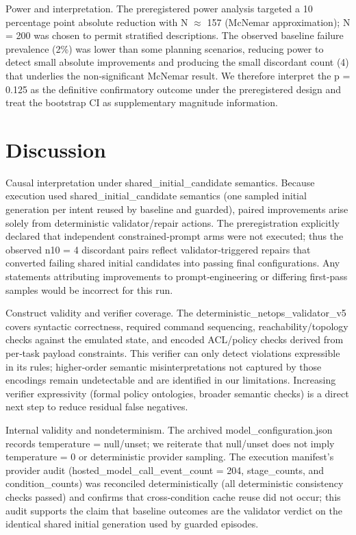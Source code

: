 \documentclass[conference]{IEEEtran}
\begin{document}
Power and interpretation. The preregistered power analysis targeted a 10 percentage point absolute reduction with N \ensuremath{\approx} 157 (McNemar approximation); N = 200 was chosen to permit stratified descriptions. The observed baseline failure prevalence (2\%) was lower than some planning scenarios, reducing power to detect small absolute improvements and producing the small discordant count (4) that underlies the non‑significant McNemar result. We therefore interpret the p = 0.125 as the definitive confirmatory outcome under the preregistered design and treat the bootstrap CI as supplementary magnitude information.

\section{Discussion}
Causal interpretation under shared\_initial\_candidate semantics. Because execution used shared\_initial\_candidate semantics (one sampled initial generation per intent reused by baseline and guarded), paired improvements arise solely from deterministic validator/repair actions. The preregistration explicitly declared that independent constrained‑prompt arms were not executed; thus the observed n10 = 4 discordant pairs reflect validator‑triggered repairs that converted failing shared initial candidates into passing final configurations. Any statements attributing improvements to prompt‑engineering or differing first‑pass samples would be incorrect for this run.

Construct validity and verifier coverage. The deterministic\_netops\_validator\_v5 covers syntactic correctness, required command sequencing, reachability/topology checks against the emulated state, and encoded ACL/policy checks derived from per‑task payload constraints. This verifier can only detect violations expressible in its rules; higher‑order semantic misinterpretations not captured by those encodings remain undetectable and are identified in our limitations. Increasing verifier expressivity (formal policy ontologies, broader semantic checks) is a direct next step to reduce residual false negatives.

Internal validity and nondeterminism. The archived model\_configuration.json records temperature = null/unset; we reiterate that null/unset does not imply temperature = 0 or deterministic provider sampling. The execution manifest's provider audit (hosted\_model\_call\_event\_count = 204, stage\_counts, and condition\_counts) was reconciled deterministically (all deterministic consistency checks passed) and confirms that cross‑condition cache reuse did not occur; this audit supports the claim that baseline outcomes are the validator verdict on the identical shared initial generation used by guarded episodes.
\end{document}
